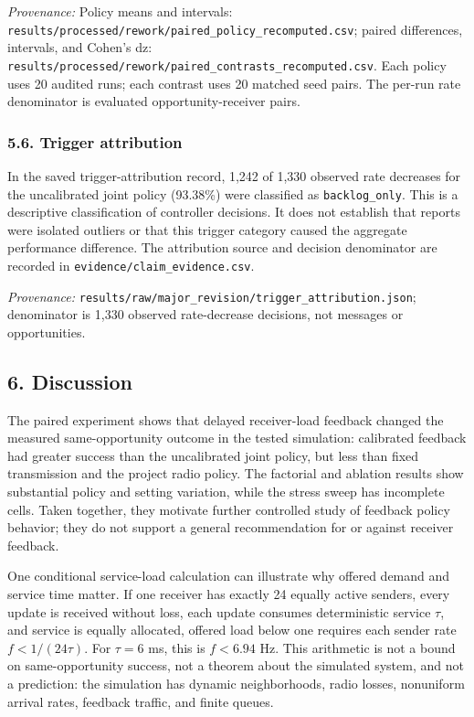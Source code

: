 \documentclass[
]{article}
\begin{document}
\emph{Provenance:} Policy means and intervals:
\texttt{results/processed/rework/paired\_policy\_recomputed.csv}; paired
differences, intervals, and Cohen's dz:
\texttt{results/processed/rework/paired\_contrasts\_recomputed.csv}.
Each policy uses 20 audited runs; each contrast uses 20 matched seed
pairs. The per-run rate denominator is evaluated opportunity-receiver
pairs.

\subsubsection{5.6. Trigger attribution}\label{trigger-attribution}

In the saved trigger-attribution record, 1,242 of 1,330 observed rate
decreases for the uncalibrated joint policy (93.38\%) were classified as
\texttt{backlog\_only}. This is a descriptive classification of
controller decisions. It does not establish that reports were isolated
outliers or that this trigger category caused the aggregate performance
difference. The attribution source and decision denominator are recorded
in \texttt{evidence/claim\_evidence.csv}.

\emph{Provenance:}
\texttt{results/raw/major\_revision/trigger\_attribution.json};
denominator is 1,330 observed rate-decrease decisions, not messages or
opportunities.

\subsection{6. Discussion}\label{discussion}

The paired experiment shows that delayed receiver-load feedback changed
the measured same-opportunity outcome in the tested simulation:
calibrated feedback had greater success than the uncalibrated joint
policy, but less than fixed transmission and the project radio policy.
The factorial and ablation results show substantial policy and setting
variation, while the stress sweep has incomplete cells. Taken together,
they motivate further controlled study of feedback policy behavior; they
do not support a general recommendation for or against receiver
feedback.

One conditional service-load calculation can illustrate why offered
demand and service time matter. If one receiver has exactly 24 equally
active senders, every update is received without loss, each update
consumes deterministic service \(\tau\), and service is equally
allocated, offered load below one requires each sender rate
\(f < 1/(24\tau)\). For \(\tau=6\) ms, this is \(f<6.94\) Hz. This
arithmetic is not a bound on same-opportunity success, not a theorem
about the simulated system, and not a prediction: the simulation has
dynamic neighborhoods, radio losses, nonuniform arrival rates, feedback
traffic, and finite queues.
\end{document}
